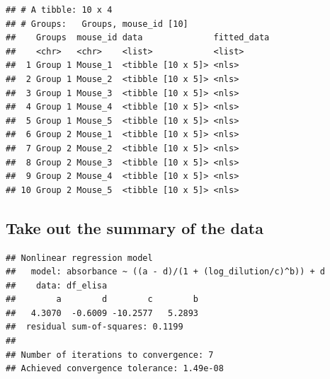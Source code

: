 \documentclass[
]{book}
\newenvironment{Shaded}{\begin{snugshade}}{\end{snugshade}}
\newcommand{\AttributeTok}[1]{\textcolor[rgb]{0.77,0.63,0.00}{#1}}
\newcommand{\DecValTok}[1]{\textcolor[rgb]{0.00,0.00,0.81}{#1}}
\newcommand{\FunctionTok}[1]{\textcolor[rgb]{0.00,0.00,0.00}{#1}}
\newcommand{\NormalTok}[1]{#1}
\newcommand{\OtherTok}[1]{\textcolor[rgb]{0.56,0.35,0.01}{#1}}
\newcommand{\SpecialCharTok}[1]{\textcolor[rgb]{0.00,0.00,0.00}{#1}}
\begin{document}
\begin{verbatim}
## # A tibble: 10 x 4
## # Groups:   Groups, mouse_id [10]
##    Groups  mouse_id data              fitted_data
##    <chr>   <chr>    <list>            <list>     
##  1 Group 1 Mouse_1  <tibble [10 x 5]> <nls>      
##  2 Group 1 Mouse_2  <tibble [10 x 5]> <nls>      
##  3 Group 1 Mouse_3  <tibble [10 x 5]> <nls>      
##  4 Group 1 Mouse_4  <tibble [10 x 5]> <nls>      
##  5 Group 1 Mouse_5  <tibble [10 x 5]> <nls>      
##  6 Group 2 Mouse_1  <tibble [10 x 5]> <nls>      
##  7 Group 2 Mouse_2  <tibble [10 x 5]> <nls>      
##  8 Group 2 Mouse_3  <tibble [10 x 5]> <nls>      
##  9 Group 2 Mouse_4  <tibble [10 x 5]> <nls>      
## 10 Group 2 Mouse_5  <tibble [10 x 5]> <nls>
\end{verbatim}

\hypertarget{take-out-the-summary-of-the-data}{%
\subsection{Take out the summary of the data}\label{take-out-the-summary-of-the-data}}

\begin{Shaded}
\end{Shaded}

\begin{verbatim}
## Nonlinear regression model
##   model: absorbance ~ ((a - d)/(1 + (log_dilution/c)^b)) + d
##    data: df_elisa
##        a        d        c        b 
##   4.3070  -0.6009 -10.2577   5.2893 
##  residual sum-of-squares: 0.1199
## 
## Number of iterations to convergence: 7 
## Achieved convergence tolerance: 1.49e-08
\end{verbatim}
\end{document}

